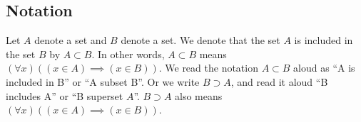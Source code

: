 
\subsection*{Notation}

Let $A$ denote a set and $B$ denote a set.
We denote that the set $A$ is included in the set $B$ by $A \subset B$.
In other words, $A \subset B$ means $(\forall x)((x \in A) \implies (x \in B))$.
We read the notation $A \subset B$ aloud as ``A is included in B'' or ``A subset B''.
Or we write $B \supset A$, and read it aloud ``B includes A'' or ``B superset $A$''.
$B \supset A$ also means $(\forall x)((x \in A) \implies (x \in B))$.

